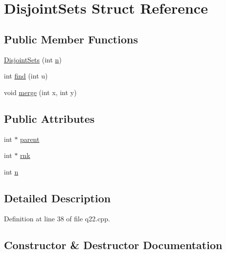 \hypertarget{struct_disjoint_sets}{}\section{Disjoint\+Sets Struct Reference}
\label{struct_disjoint_sets}
\subsection*{Public Member Functions}
\begin{DoxyCompactItemize}
\item 
\hyperlink{struct_disjoint_sets_a26da401bf4e56a876533c97643c7d9c2}{Disjoint\+Sets} (int \hyperlink{struct_disjoint_sets_aeb43c9e003e2bd5b83b5c60d56dfd23e}{n})
\item 
int \hyperlink{struct_disjoint_sets_a14ff5306079945dd59c0c6d55129ac2e}{find} (int u)
\item 
void \hyperlink{struct_disjoint_sets_a349af3d249271920c355d9ef2a641f87}{merge} (int x, int y)
\end{DoxyCompactItemize}
\subsection*{Public Attributes}
\begin{DoxyCompactItemize}
\item 
int $\ast$ \hyperlink{struct_disjoint_sets_ad7f9caf9365a04a1c6670aa372a3cdbd}{parent}
\item 
int $\ast$ \hyperlink{struct_disjoint_sets_a93f26d80d2fb349bd97793fb41e502e8}{rnk}
\item 
int \hyperlink{struct_disjoint_sets_aeb43c9e003e2bd5b83b5c60d56dfd23e}{n}
\end{DoxyCompactItemize}


\subsection{Detailed Description}


Definition at line 38 of file q22.\+cpp.



\subsection{Constructor \& Destructor Documentation}
\mbox{\label{struct_disjoint_sets_a26da401bf4e56a876533c97643c7d9c2}} 
